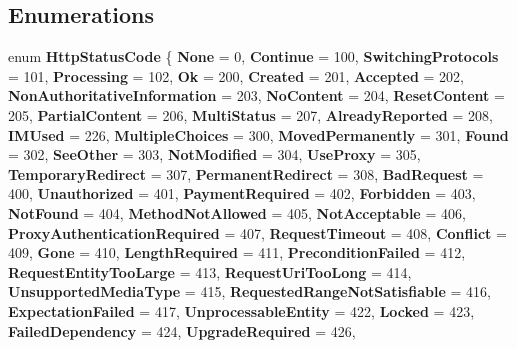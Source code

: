 \subsection*{Enumerations}
\begin{DoxyCompactItemize}
\item 
\mbox{\label{namespace_windows_1_1_web_1_1_http_a2378c3ed9d3b208a45e8b6dcc91ea4e4}} 
enum {\bfseries Http\+Status\+Code} \{ \newline
{\bfseries None} = 0, 
{\bfseries Continue} = 100, 
{\bfseries Switching\+Protocols} = 101, 
{\bfseries Processing} = 102, 
\newline
{\bfseries Ok} = 200, 
{\bfseries Created} = 201, 
{\bfseries Accepted} = 202, 
{\bfseries Non\+Authoritative\+Information} = 203, 
\newline
{\bfseries No\+Content} = 204, 
{\bfseries Reset\+Content} = 205, 
{\bfseries Partial\+Content} = 206, 
{\bfseries Multi\+Status} = 207, 
\newline
{\bfseries Already\+Reported} = 208, 
{\bfseries I\+M\+Used} = 226, 
{\bfseries Multiple\+Choices} = 300, 
{\bfseries Moved\+Permanently} = 301, 
\newline
{\bfseries Found} = 302, 
{\bfseries See\+Other} = 303, 
{\bfseries Not\+Modified} = 304, 
{\bfseries Use\+Proxy} = 305, 
\newline
{\bfseries Temporary\+Redirect} = 307, 
{\bfseries Permanent\+Redirect} = 308, 
{\bfseries Bad\+Request} = 400, 
{\bfseries Unauthorized} = 401, 
\newline
{\bfseries Payment\+Required} = 402, 
{\bfseries Forbidden} = 403, 
{\bfseries Not\+Found} = 404, 
{\bfseries Method\+Not\+Allowed} = 405, 
\newline
{\bfseries Not\+Acceptable} = 406, 
{\bfseries Proxy\+Authentication\+Required} = 407, 
{\bfseries Request\+Timeout} = 408, 
{\bfseries Conflict} = 409, 
\newline
{\bfseries Gone} = 410, 
{\bfseries Length\+Required} = 411, 
{\bfseries Precondition\+Failed} = 412, 
{\bfseries Request\+Entity\+Too\+Large} = 413, 
\newline
{\bfseries Request\+Uri\+Too\+Long} = 414, 
{\bfseries Unsupported\+Media\+Type} = 415, 
{\bfseries Requested\+Range\+Not\+Satisfiable} = 416, 
{\bfseries Expectation\+Failed} = 417, 
\newline
{\bfseries Unprocessable\+Entity} = 422, 
{\bfseries Locked} = 423, 
{\bfseries Failed\+Dependency} = 424, 
{\bfseries Upgrade\+Required} = 426, 

\end{DoxyCompactItemize}
